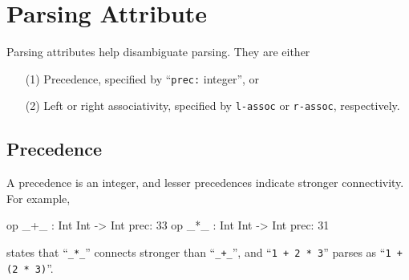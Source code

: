 \documentclass[a4paper]{memoir}
\begin{document}
\section{Parsing Attribute}\label{sec:p2-syntactic-properties}

Parsing attributes help disambiguate parsing. They are either
\begin{itemize}
\item[(1)] Precedence, specified by
  ``\verb|prec:| integer'', or
\item[(2)] Left or right associativity, specified by \verb|l-assoc| or
  \verb|r-assoc|, respectively.
\end{itemize}

\subsection{Precedence}

A precedence is an integer, and lesser precedences indicate stronger
connectivity. For example,
\begin{vvtm}
\begin{ccode}
   op _+_ : Int Int -> Int { prec: 33 }
   op _*_ : Int Int -> Int { prec: 31 }
\end{ccode}
\end{vvtm}
states that ``\verb|_*_|'' connects stronger than ``\verb|_+_|'', and
``\verb|1 + 2 * 3|'' parses as ``\verb|1 + (2 * 3)|''.
\end{document}
